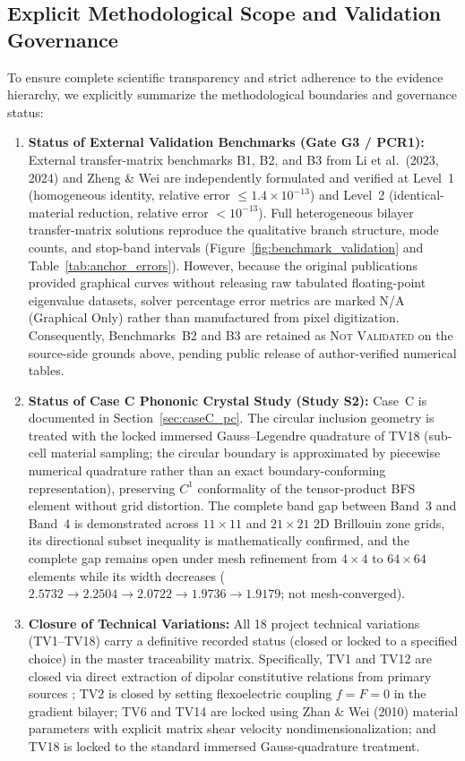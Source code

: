 \subsection{Explicit Methodological Scope and Validation Governance}
To ensure complete scientific transparency and strict adherence to the evidence hierarchy, we explicitly summarize the methodological boundaries and governance status:
\begin{enumerate}
  \item \textbf{Status of External Validation Benchmarks (Gate G3 / PCR1):}
  External transfer-matrix benchmarks B1, B2, and B3 from Li et al.\ (2023, 2024) \cite{li2023anchorA,li2024anchorB} and Zheng \& Wei \cite{zhengwei2009} are independently formulated and verified at Level~1 (homogeneous identity, relative error $\le 1.4 \times 10^{-13}$) and Level~2 (identical-material reduction, relative error $< 10^{-13}$). Full heterogeneous bilayer transfer-matrix solutions reproduce the qualitative branch structure, mode counts, and stop-band intervals (Figure~\ref{fig:benchmark_validation} and Table~\ref{tab:anchor_errors}). However, because the original publications provided graphical curves without releasing raw tabulated floating-point eigenvalue datasets, solver percentage error metrics are marked N/A (Graphical Only) rather than manufactured from pixel digitization. Consequently, Benchmarks~B2 and B3 are retained as \textsc{Not Validated} on the source-side grounds above, pending public release of author-verified numerical tables.
  \item \textbf{Status of Case C Phononic Crystal Study (Study S2):}
  Case~C is documented in Section~\ref{sec:caseC_pc}. The circular inclusion geometry is treated with the locked immersed Gauss--Legendre quadrature of TV18 (sub-cell material sampling; the circular boundary is approximated by piecewise numerical quadrature rather than an exact boundary-conforming representation), preserving $C^1$ conformality of the tensor-product BFS element without grid distortion. The complete band gap between Band~3 and Band~4 is demonstrated across $11\times 11$ and $21\times 21$ 2D Brillouin zone grids, its directional subset inequality is mathematically confirmed, and the complete gap remains open under mesh refinement from $4\times 4$ to $64\times 64$ elements while its width decreases ($2.5732 \to 2.2504 \to 2.0722 \to 1.9736 \to 1.9179$; not mesh-converged).
  \item \textbf{Closure of Technical Variations:}
  All 18 project technical variations (TV1--TV18) carry a definitive recorded status (closed or locked to a specified choice) in the master traceability matrix. Specifically, TV1 and TV12 are closed via direct extraction of dipolar constitutive relations from primary sources \cite{li2023anchorA, liweizhou2016}; TV2 is closed by setting flexoelectric coupling $f = F = 0$ in the gradient bilayer; TV6 and TV14 are locked using Zhan \& Wei (2010) \cite{zhanwei2010} material parameters with explicit matrix shear velocity nondimensionalization; and TV18 is locked to the standard immersed Gauss-quadrature treatment.

\end{enumerate}

